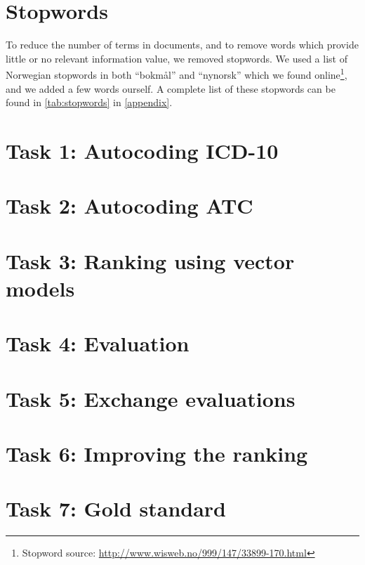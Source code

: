 \section{Stopwords}
To reduce the number of terms in documents, and to remove words which provide
little or no relevant information value, we removed stopwords.
We used a list of Norwegian stopwords in both ``bokmål'' and ``nynorsk''
which we found
online\footnote{Stopword source: \url{http://www.wisweb.no/999/147/33899-170.html}},
and we added a few words ourself. A complete list of these stopwords can
be found in \autoref{tab:stopwords} in \autoref{appendix}.



\section{Task 1: Autocoding ICD-10}


\section{Task 2: Autocoding ATC}


\section{Task 3: Ranking using vector models}


\section{Task 4: Evaluation}


\section{Task 5: Exchange evaluations}


\section{Task 6: Improving the ranking}


\section{Task 7: Gold standard}


